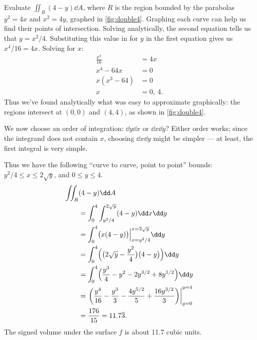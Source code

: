 \begin{example}\label{ex_double4}
Evaluate $\iint_R (4-y)\dd A$, where $R$ is the region bounded by the parabolas $y^2=4x$ and $x^2=4y$, graphed in \autoref{fig:double4}.
%
%
\solution
Graphing each curve can help us find their points of intersection. Solving analytically, the second equation tells us that $y=x^2/4$. Substituting this value in for $y$ in the first equation gives us $x^4/16 = 4x$. Solving for $x$:
\begin{align*}
\frac{x^4}{16} &= 4x\\
x^4-64x &=0\\
x(x^3-64) &=0\\
x&= 0,\ 4.
\end{align*}
Thus we've found analytically what was easy to approximate graphically: the regions intersect at $(0,0)$ and $(4,4)$, as shown in \autoref{fig:double4}. 

We now choose an order of integration: $\dd y\dd x$ or $\dd x\dd y$? Either order works; since the integrand does not contain $x$, choosing $\dd x\dd y$ might be simpler --- at least, the first integral is very simple.

Thus we have the following ``curve to curve, point to point'' bounds: $y^2/4\leq x\leq 2\sqrt y$, and $0\leq y\leq 4$. 
\begin{align*}
\iint_R &(4-y)\dd A \\
	&= \int_0^4\int_{y^2/4}^{2\sqrt{y}}(4-y)\dd x\dd y\\
	&= \int_0^4 \bigl(x(4-y)\bigr)\Big|_{x=y^2/4}^{x=2\sqrt{y}}\dd y\\
	&= \int_0^4 \Bigl(\bigl(2\sqrt{y}-\frac{y^2}{4}\bigr)\bigl(4-y\bigr)\Bigr)\dd y\\
	&= \int_0^4 \Bigl( \frac{y^3}{4}-y^2-2y^{3/2}+8y^{1/2}\Bigr)\dd y\\
	&= \left.\left(\frac{y^4}{16}-\frac{y^3}{3}-\frac{4y^{5/2}}5+\frac{16y^{3/2}}3\right)\right|_{y=0}^{y=4}\\
	&= \frac{176}{15} = 11.7\overline{3}.
\end{align*}
The signed volume under the surface $f$ is about 11.7 cubic units.
\end{example}

